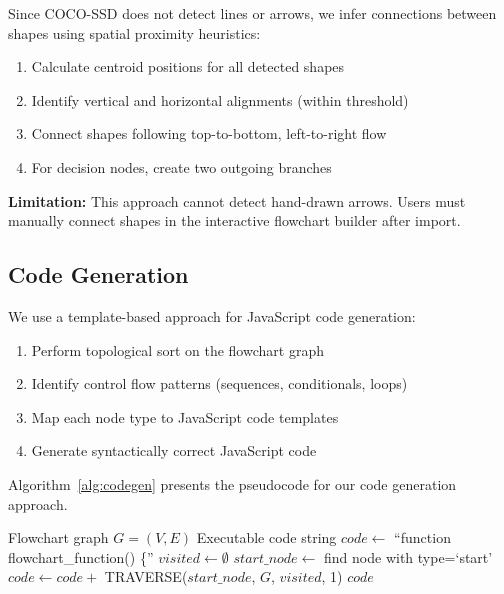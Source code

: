 \documentclass[11pt,a4paper]{article}
\begin{document}
Since COCO-SSD does not detect lines or arrows, we infer connections between shapes using spatial proximity heuristics:

\begin{enumerate}[leftmargin=*]
    \item Calculate centroid positions for all detected shapes
    \item Identify vertical and horizontal alignments (within threshold)
    \item Connect shapes following top-to-bottom, left-to-right flow
    \item For decision nodes, create two outgoing branches
\end{enumerate}

\textbf{Limitation:} This approach cannot detect hand-drawn arrows. Users must manually connect shapes in the interactive flowchart builder after import.

\subsection{Code Generation}

We use a template-based approach for JavaScript code generation:

\begin{enumerate}[leftmargin=*]
    \item Perform topological sort on the flowchart graph
    \item Identify control flow patterns (sequences, conditionals, loops)
    \item Map each node type to JavaScript code templates
    \item Generate syntactically correct JavaScript code
\end{enumerate}

Algorithm~\ref{alg:codegen} presents the pseudocode for our code generation approach.

\begin{algorithm}
\caption{Code Generation}
\label{alg:codegen}
\begin{algorithmic}[1]
\REQUIRE Flowchart graph $G = (V, E)$
\ENSURE Executable code string
\STATE $code \gets$ ``function flowchart\_function() \{''
\STATE $visited \gets \emptyset$
\STATE $start\_node \gets$ find node with type=`start'
\STATE $code \gets code +$ TRAVERSE($start\_node$, $G$, $visited$, 1)
\RETURN $code$
\end{algorithmic}
\end{algorithm}
\end{document}
